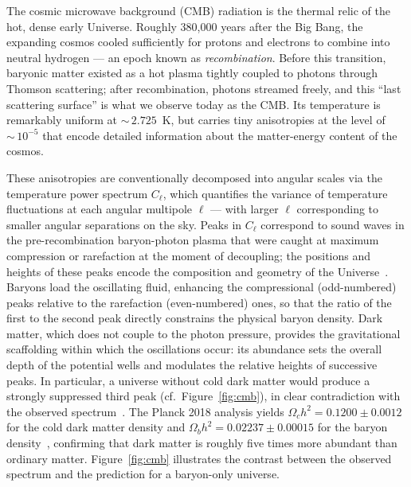 The cosmic microwave background (CMB) radiation is the thermal relic of the hot, dense early Universe.
Roughly 380,000 years after the Big Bang, the expanding cosmos cooled sufficiently for protons and electrons to combine into neutral hydrogen --- an epoch known as \emph{recombination}.
Before this transition, baryonic matter existed as a hot plasma tightly coupled to photons through Thomson scattering; after recombination, photons streamed freely, and this ``last scattering surface'' is what we observe today as the CMB.
Its temperature is remarkably uniform at ${\sim}\,2.725$~K, but carries tiny anisotropies at the level of ${\sim}\,10^{-5}$ that encode detailed information about the matter-energy content of the cosmos.

These anisotropies are conventionally decomposed into angular scales via the temperature power spectrum $C_\ell$, which quantifies the variance of temperature fluctuations at each angular multipole $\ell$ --- with larger $\ell$ corresponding to smaller angular separations on the sky.
Peaks in $C_\ell$ correspond to sound waves in the pre-recombination baryon-photon plasma that were caught at maximum compression or rarefaction at the moment of decoupling; the positions and heights of these peaks encode the composition and geometry of the Universe~\cite{Aghanim:2018eyx,Cirelli:2024ssz}.
Baryons load the oscillating fluid, enhancing the compressional (odd-numbered) peaks relative to the rarefaction (even-numbered) ones, so that the ratio of the first to the second peak directly constrains the physical baryon density.
Dark matter, which does not couple to the photon pressure, provides the gravitational scaffolding within which the oscillations occur: its abundance sets the overall depth of the potential wells and modulates the relative heights of successive peaks.
In particular, a universe without cold dark matter would produce a strongly suppressed third peak (cf.\ Figure~\ref{fig:cmb}), in clear contradiction with the observed spectrum~\cite{Cirelli:2024ssz}.
The Planck 2018 analysis yields $\Omega_c h^2 = 0.1200 \pm 0.0012$ for the cold dark matter density and $\Omega_b h^2 = 0.02237 \pm 0.00015$ for the baryon density~\cite{Aghanim:2018eyx}, confirming that dark matter is roughly five times more abundant than ordinary matter.
Figure~\ref{fig:cmb} illustrates the contrast between the observed spectrum and the prediction for a baryon-only universe.

